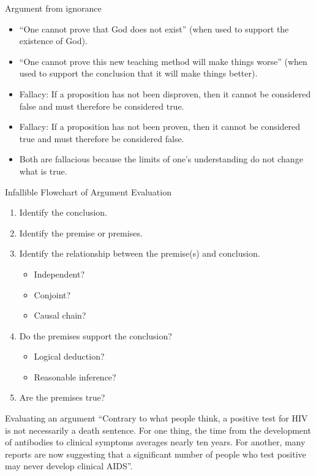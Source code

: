 \documentclass{beamer}
\begin{document}
\begin{frame}{Argument from ignorance}
\begin{itemize}
\item ``One cannot prove that God does not exist'' (when used to support the existence of God).
\item ``One cannot prove this new teaching method will make things worse'' (when used to support the conclusion that it will make things better). 
\item Fallacy: If a proposition has not been disproven, then it cannot be considered false and must therefore be considered true.
\item Fallacy: If a proposition has not been proven, then it cannot be considered true and must therefore be considered false.
\item Both are fallacious because the limits of one's understanding do not change what is true.
\end{itemize}
\end{frame}



\begin{frame}{Infallible Flowchart of Argument Evaluation}
\begin{enumerate}
\item Identify the conclusion.
\item Identify the premise or premises.
\item Identify the relationship between the premise(s) and conclusion.
\begin{itemize}
\item Independent?
\item Conjoint?
\item Causal chain?
\end{itemize}
\item Do the premises support the conclusion?
\begin{itemize}
\item Logical deduction?
\item Reasonable inference?
\end{itemize}
\item Are the premises true?
\end{enumerate}
\end{frame}


\begin{frame}{Evaluating an argument}
``Contrary to what people think, a positive test for HIV is not necessarily a death sentence. For one thing, the time from the development of antibodies to clinical symptoms averages nearly ten years. For another, many reports are now suggesting that a significant number of people who test positive may never develop clinical AIDS''.
\end{frame}
\end{document}
